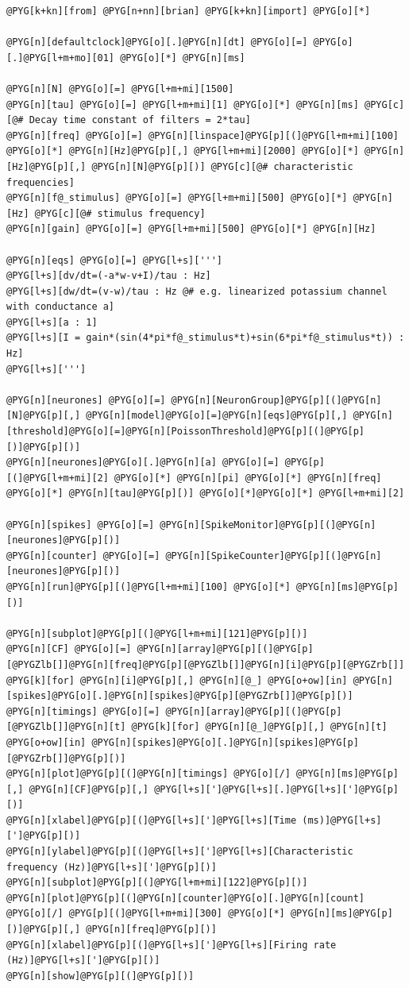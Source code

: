 \documentclass[letterpaper,10pt,english]{manual}
\begin{document}
\begin{Verbatim}[commandchars=@\[\]]
@PYG[k+kn][from] @PYG[n+nn][brian] @PYG[k+kn][import] @PYG[o][*]

@PYG[n][defaultclock]@PYG[o][.]@PYG[n][dt] @PYG[o][=] @PYG[o][.]@PYG[l+m+mo][01] @PYG[o][*] @PYG[n][ms]

@PYG[n][N] @PYG[o][=] @PYG[l+m+mi][1500]
@PYG[n][tau] @PYG[o][=] @PYG[l+m+mi][1] @PYG[o][*] @PYG[n][ms] @PYG[c][@# Decay time constant of filters = 2*tau]
@PYG[n][freq] @PYG[o][=] @PYG[n][linspace]@PYG[p][(]@PYG[l+m+mi][100] @PYG[o][*] @PYG[n][Hz]@PYG[p][,] @PYG[l+m+mi][2000] @PYG[o][*] @PYG[n][Hz]@PYG[p][,] @PYG[n][N]@PYG[p][)] @PYG[c][@# characteristic frequencies]
@PYG[n][f@_stimulus] @PYG[o][=] @PYG[l+m+mi][500] @PYG[o][*] @PYG[n][Hz] @PYG[c][@# stimulus frequency]
@PYG[n][gain] @PYG[o][=] @PYG[l+m+mi][500] @PYG[o][*] @PYG[n][Hz]

@PYG[n][eqs] @PYG[o][=] @PYG[l+s][''']
@PYG[l+s][dv/dt=(-a*w-v+I)/tau : Hz]
@PYG[l+s][dw/dt=(v-w)/tau : Hz @# e.g. linearized potassium channel with conductance a]
@PYG[l+s][a : 1]
@PYG[l+s][I = gain*(sin(4*pi*f@_stimulus*t)+sin(6*pi*f@_stimulus*t)) : Hz]
@PYG[l+s][''']

@PYG[n][neurones] @PYG[o][=] @PYG[n][NeuronGroup]@PYG[p][(]@PYG[n][N]@PYG[p][,] @PYG[n][model]@PYG[o][=]@PYG[n][eqs]@PYG[p][,] @PYG[n][threshold]@PYG[o][=]@PYG[n][PoissonThreshold]@PYG[p][(]@PYG[p][)]@PYG[p][)]
@PYG[n][neurones]@PYG[o][.]@PYG[n][a] @PYG[o][=] @PYG[p][(]@PYG[l+m+mi][2] @PYG[o][*] @PYG[n][pi] @PYG[o][*] @PYG[n][freq] @PYG[o][*] @PYG[n][tau]@PYG[p][)] @PYG[o][*]@PYG[o][*] @PYG[l+m+mi][2]

@PYG[n][spikes] @PYG[o][=] @PYG[n][SpikeMonitor]@PYG[p][(]@PYG[n][neurones]@PYG[p][)]
@PYG[n][counter] @PYG[o][=] @PYG[n][SpikeCounter]@PYG[p][(]@PYG[n][neurones]@PYG[p][)]
@PYG[n][run]@PYG[p][(]@PYG[l+m+mi][100] @PYG[o][*] @PYG[n][ms]@PYG[p][)]

@PYG[n][subplot]@PYG[p][(]@PYG[l+m+mi][121]@PYG[p][)]
@PYG[n][CF] @PYG[o][=] @PYG[n][array]@PYG[p][(]@PYG[p][@PYGZlb[]]@PYG[n][freq]@PYG[p][@PYGZlb[]]@PYG[n][i]@PYG[p][@PYGZrb[]] @PYG[k][for] @PYG[n][i]@PYG[p][,] @PYG[n][@_] @PYG[o+ow][in] @PYG[n][spikes]@PYG[o][.]@PYG[n][spikes]@PYG[p][@PYGZrb[]]@PYG[p][)]
@PYG[n][timings] @PYG[o][=] @PYG[n][array]@PYG[p][(]@PYG[p][@PYGZlb[]]@PYG[n][t] @PYG[k][for] @PYG[n][@_]@PYG[p][,] @PYG[n][t] @PYG[o+ow][in] @PYG[n][spikes]@PYG[o][.]@PYG[n][spikes]@PYG[p][@PYGZrb[]]@PYG[p][)]
@PYG[n][plot]@PYG[p][(]@PYG[n][timings] @PYG[o][/] @PYG[n][ms]@PYG[p][,] @PYG[n][CF]@PYG[p][,] @PYG[l+s][']@PYG[l+s][.]@PYG[l+s][']@PYG[p][)]
@PYG[n][xlabel]@PYG[p][(]@PYG[l+s][']@PYG[l+s][Time (ms)]@PYG[l+s][']@PYG[p][)]
@PYG[n][ylabel]@PYG[p][(]@PYG[l+s][']@PYG[l+s][Characteristic frequency (Hz)]@PYG[l+s][']@PYG[p][)]
@PYG[n][subplot]@PYG[p][(]@PYG[l+m+mi][122]@PYG[p][)]
@PYG[n][plot]@PYG[p][(]@PYG[n][counter]@PYG[o][.]@PYG[n][count] @PYG[o][/] @PYG[p][(]@PYG[l+m+mi][300] @PYG[o][*] @PYG[n][ms]@PYG[p][)]@PYG[p][,] @PYG[n][freq]@PYG[p][)]
@PYG[n][xlabel]@PYG[p][(]@PYG[l+s][']@PYG[l+s][Firing rate (Hz)]@PYG[l+s][']@PYG[p][)]
@PYG[n][show]@PYG[p][(]@PYG[p][)]
\end{Verbatim}
\end{document}
